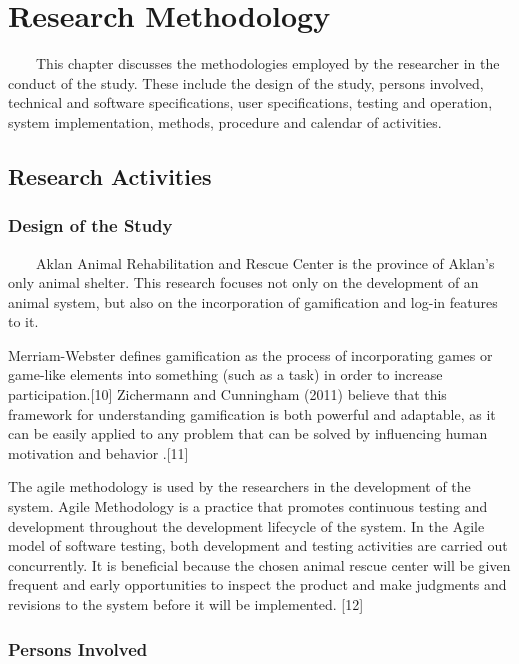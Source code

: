 \chapter{Research Methodology}

~~~~This chapter discusses the methodologies employed by the researcher in the conduct of the study. These include the design of the study, persons involved, technical and software specifications, user specifications, testing and operation, system implementation, methods, procedure and calendar of activities. 


\section{Research Activities}

\subsection{Design of the Study}
	
~~~~Aklan Animal Rehabilitation and Rescue Center is the province of Aklan's only animal shelter. This research focuses not only on the development of an animal system, but also on the incorporation of gamification and log-in features to it.

Merriam-Webster defines gamification as the process of incorporating games or game-like elements into something (such as a task) in order to increase participation.[10] Zichermann and Cunningham (2011) believe that this framework for understanding gamification is both powerful and adaptable, as it can be easily applied to any problem that can be solved by influencing human motivation and behavior .[11]

The agile methodology is used by the researchers in the development of the system. Agile Methodology is a practice that promotes continuous testing and development throughout the development lifecycle of the system. In the Agile model of software testing, both development and testing activities are carried out concurrently. It is beneficial because the chosen animal rescue center will be given frequent and early opportunities to inspect the product and make judgments and revisions to the system before it will be implemented. [12]

\subsection{Persons Involved}

